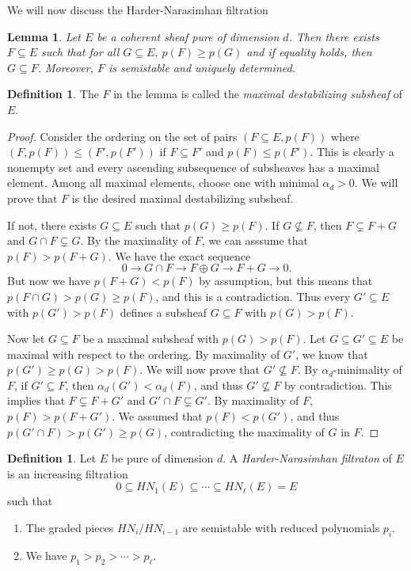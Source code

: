 \documentclass[leqno, openany]{memoir}
\newtheorem{lem}[thm]{Lemma}
\theoremstyle{definition}
\newtheorem{defn}[thm]{Definition}
\theoremstyle{remark}
\theoremstyle{plain}
\theoremstyle{definition}
\theoremstyle{remark}
\begin{document}
We will now discuss the Harder-Narasimhan filtration
\begin{lem}
    Let $E$ be a coherent sheaf pure of dimension $d$. Then there exists $F \subseteq E$ such that for all $G \subseteq E$, $p(F) \geq p(G)$ and if equality holds, then $G \subseteq F$. Moreover, $F$ is semistable and uniquely determined.
\end{lem}

\begin{defn}
    The $F$ in the lemma is called the \textit{maximal destabilizing subsheaf} of $E$.
\end{defn}

\begin{proof}
    Consider the ordering on the set of pairs $(F \subseteq E, p(F))$ where $(F, p(F)) \leq (F', p(F'))$ if $F \subseteq F'$ and $p(F) \leq p(F')$. This is clearly a nonempty set and every ascending subsequence of subsheaves has a maximal element. Among all maximal elements, choose one with minimal $\alpha_d > 0$. We will prove that $F$ is the desired maximal destabilizing subsheaf.

    If not, there exists $G \subseteq E$ such that $p(G) \geq p(F)$. If $G \not\subseteq F$, then $F \subsetneq F + G$ and $G \cap F \subsetneq G$. By the maximality of $F$, we can asssume that $p(F) > p(F + G)$. We have the exact sequence
    \[ 0 \to G \cap F \to F \oplus G \to F + G \to 0. \]
    But now we have $p(F + G) < p(F)$ by assumption, but this means that $p(F \cap G) > p(G) \geq p(F)$, and this is a contradiction. Thus every $G' \subseteq E$ with $p(G') > p(F)$ defines a subsheaf $G \subseteq F$ with $p(G) > p(F)$.

    Now let $G \subseteq F$ be a maximal subsheaf with $p(G) > p(F)$. Let $G \subseteq G' \subseteq E$ be maximal with respect to the ordering. By maximality of $G'$, we know that $p(G') \geq p(G) > p(F)$. We will now prove that $G' \not\subseteq F$. By $\alpha_d$-minimality of $F$, if $G' \subseteq F$, then $\alpha_d(G') < \alpha_d(F)$, and thus $G' \not\subseteq F$ by contradiction. This implies that $F \subsetneq F + G'$ and $G' \cap F \subsetneq G'$. By maximality of $F$, $p(F) > p(F + G')$. We assumed that $p(F) < p(G')$, and thus $p(G' \cap F) > p(G') \geq p(G)$, contradicting the maximality of $G$ in $F$.
\end{proof}

\begin{defn}
    Let $E$ be pure of dimension $d$. A \textit{Harder-Narasimhan filtraton} of $E$ is an increasing filtration
    \[ 0 \subseteq HN_1(E) \subseteq \cdots \subseteq HN_{\ell}(E) = E \]
    such that
    \begin{enumerate}
        \item The graded pieces $HN_i / HN_{i-1}$ are semistable with reduced polynomials $p_i$.
        \item We have $p_1 > p_2 > \cdots > p_{\ell}$.
    \end{enumerate}
\end{defn}
\end{document}
